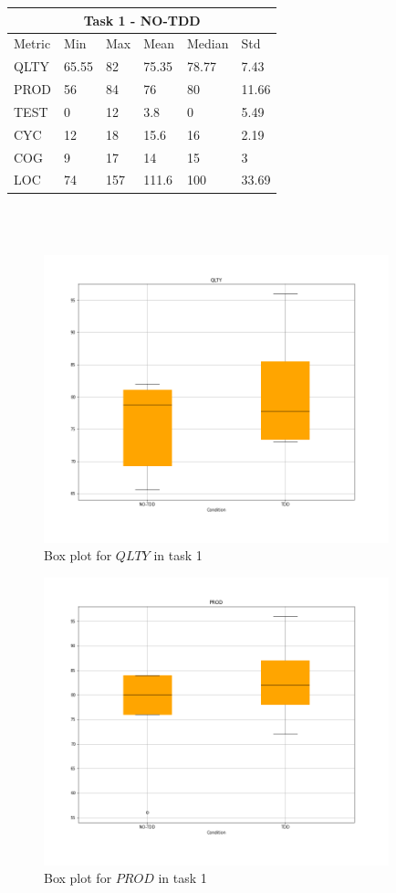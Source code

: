 \noindent
\begin{tabular}{ |p{2cm}||p{1.6cm}|p{1.6cm}|p{1.6cm}|p{1.6cm}|p{1.6cm}|}
    \hline
        \multicolumn{6}{|c|}{Task 1 - NO-TDD} \\
    \hline
        Metric & Min & Max & Mean & Median & Std\\
    \hline
        QLTY & 65.55 & 82 & 75.35 & 78.77 & 7.43 \\
        PROD & 56 & 84 & 76 & 80 & 11.66 \\
        TEST & 0 & 12 & 3.8 & 0 & 5.49 \\
        CYC & 12 & 18 & 15.6 & 16 & 2.19 \\
        COG & 9 & 17 & 14 & 15 & 3 \\
        LOC & 74 & 157 & 111.6 & 100 & 33.69 \\
    \hline
\end{tabular}
\\ \  \\


\begin{figure}[H]
    \centering
    \includegraphics[width=10cm, scale=0.5]{figures/box plots/task1/p1_condition_qlty_bp.png}
    \caption{Box plot for $QLTY$ in task 1}
    \label{fig: Box plot for QLTY in task 1}
\end{figure}

\begin{figure}[H]
    \centering
    \includegraphics[width=10cm, scale=0.5]{figures/box plots/task1/p1_condition_prod_bp.png}
    \caption{Box plot for $PROD$ in task 1}
    \label{fig: Box plot for PROD in task 1}
\end{figure}

